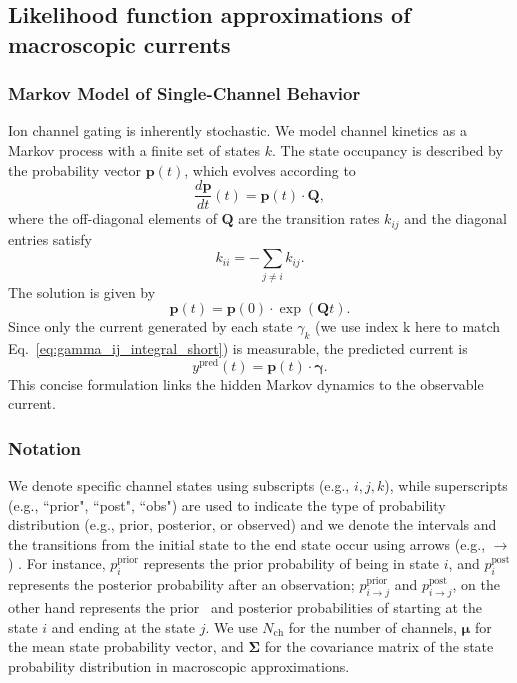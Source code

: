 \documentclass[pdflatex,sn-nature]{sn-jnl}%
\begin{document}

\subsection{Likelihood function approximations of macroscopic currents}

\subsubsection{Markov Model of Single-Channel Behavior}
\label{sec:markov_model}
Ion channel gating is inherently stochastic. We model channel kinetics as a Markov process with a finite set of states \(k\). The state occupancy is described by the probability vector \(\boldsymbol{p}(t)\), which evolves according to
\begin{equation}
    \frac{d\boldsymbol{p}}{dt}(t) = \boldsymbol{p}(t)\cdot \boldsymbol{Q},
    \label{eq:master_equation_short}
\end{equation}
where the off-diagonal elements of \(\boldsymbol{Q}\) are the transition rates \(k_{ij}\) and the diagonal entries satisfy
\begin{equation}
    k_{ii} = -\sum_{j\neq i} k_{ij}.
    \label{eq:Q_diag_short}
\end{equation}
The solution is given by
\begin{equation}
    \boldsymbol{p}(t) = \boldsymbol{p}(0) \cdot \exp(\boldsymbol{Q}t).
    \label{eq:master equation solution}
\end{equation}
Since only the current generated by each state \(\gamma_k\) (we use index k here to match Eq.~\ref{eq:gamma_ij_integral_short}) is measurable, the predicted current is
\begin{equation}
    y^{\text{pred}}(t) = \boldsymbol{p}(t)\cdot \boldsymbol{\gamma}.
    \label{eq:current_pred_short}
\end{equation}
This concise formulation links the hidden Markov dynamics to the observable current.

\subsubsection{Notation}
\label{sec:notation}
We denote specific channel states using subscripts (e.g., \( i, j, k \)), while superscripts (e.g., ``prior", ``post", ``obs") are used to indicate the type of probability distribution (e.g., prior, posterior, or observed) and we denote the intervals and the transitions from the initial state to the end state occur using arrows (e.g., $\rightarrow$) . For instance, \( p_i^{\text{prior}} \) represents the prior probability of being in state \( i \), and \( p_i^{\text{post}} \) represents the posterior probability after an observation; $p_{i \rightarrow j}^{\text{prior}}$ and $p_{i \rightarrow j}^{\text{post}}$, on the other hand represents the prior  and posterior probabilities of starting at the state $i$ and ending at the state $j$. We use \(N_{\text{ch}}\) for the number of channels, \(\boldsymbol{\mu}\) for the mean state probability vector, and \(\boldsymbol{\Sigma}\) for the covariance matrix of the state probability distribution in macroscopic approximations.
\end{document}

